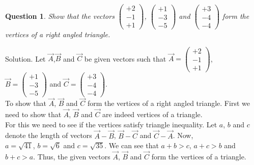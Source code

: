 \documentclass{article}
\newtheorem{question}[theorem]{Question}
\begin{document}
\begin{question}
	Show that the vectors $\begin{pmatrix} 
		 +2\\-1\\+1 
	\end{pmatrix}$, $\begin{pmatrix} 
	 +1\\-3\\-5 
\end{pmatrix}$ and $\begin{pmatrix} 
+3\\-4\\-4 
\end{pmatrix}$ form the vertices of a right angled triangle.
\end{question}
Solution. Let $\vec{A}$,$\vec{B}$  and $\vec{C}$ be given vectors such that $\vec{A} =\begin{pmatrix} 
	+2\\-1\\+1 
\end{pmatrix}$,\\     
$\vec{B}= \begin{pmatrix} 
+1\\-3\\-5 
\end{pmatrix}$ and $\vec{C}= \begin{pmatrix} 
+3\\-4\\-4 
\end{pmatrix}$.\\
To show that $\vec{A}$, $\vec{B}$ and $\vec{C}$ form the vertices of a right angled triangle. First we need to show that $\vec{A}$, $\vec{B}$ and $\vec{C}$ are indeed vertices of a triangle.\\
For this we need to see if the vertices satisfy triangle inequality. Let $a$, $b$ and $c$ denote the length of vectors $\vec{A}- \vec{B}$, $\vec{B}-\vec{C}$ and $\vec{C}- \vec{A}$. Now,\\
$a=\sqrt{41}$, $b=\sqrt{6}$ and $c=\sqrt{35}$. We can see that  $a+b>c$, 
$a+c>b$ and $b+c >a$. Thus, the given vectors $\vec{A}$, $\vec{B}$ and $\vec{C}$ form the vertices of a triangle.\\
\end{document}
